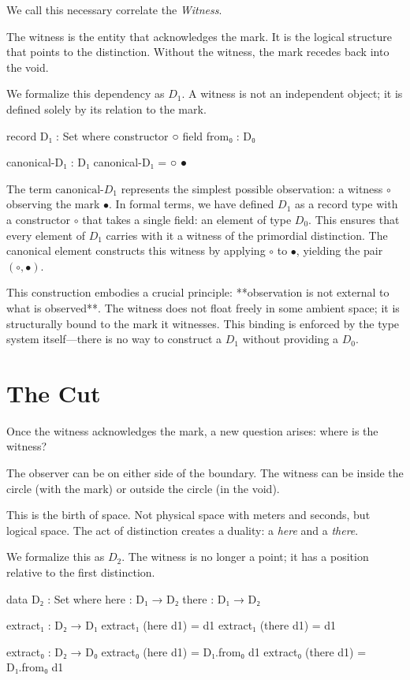 \documentclass[11pt,a4paper]{book}
\begin{document}
We call this necessary correlate the \emph{Witness}.

The witness is the entity that acknowledges the mark. It is the logical 
structure that points to the distinction. Without the witness, the mark 
recedes back into the void.

We formalize this dependency as $D_1$. A witness is not an independent 
object; it is defined solely by its relation to the mark.

\begin{code}
record D₁ : Set where
  constructor ○
  field
    from₀ : D₀

canonical-D₁ : D₁
canonical-D₁ = ○ ●
\end{code}

The term $\text{canonical-}D_1$ represents the simplest possible observation: 
a witness $\circ$ observing the mark $\bullet$. In formal terms, we have defined 
$D_1$ as a record type with a constructor $\circ$ that takes a single field: an 
element of type $D_0$. This ensures that every element of $D_1$ carries with it 
a witness of the primordial distinction. The canonical element constructs this 
witness by applying $\circ$ to $\bullet$, yielding the pair $(\circ, \bullet)$.

This construction embodies a crucial principle: **observation is not external to 
what is observed**. The witness does not float freely in some ambient space; it 
is structurally bound to the mark it witnesses. This binding is enforced by the 
type system itself—there is no way to construct a $D_1$ without providing a $D_0$.

\chapter{The Cut}

Once the witness acknowledges the mark, a new question arises: where is the 
witness?

The observer can be on either side of the boundary. 
The witness can be inside the circle (with the mark) or outside the circle 
(in the void).

This is the birth of space. Not physical space with meters and seconds, but 
logical space. The act of distinction creates a duality: a \emph{here} and 
a \emph{there}.

We formalize this as $D_2$. The witness is no longer a point; it has a 
position relative to the first distinction.

\begin{code}
data D₂ : Set where
  here  : D₁ → D₂
  there : D₁ → D₂

extract₁ : D₂ → D₁
extract₁ (here d1)  = d1
extract₁ (there d1) = d1

extract₀ : D₂ → D₀
extract₀ (here d1)  = D₁.from₀ d1
extract₀ (there d1) = D₁.from₀ d1
\end{code}
\end{document}

